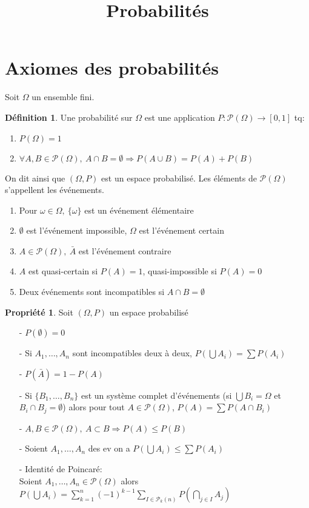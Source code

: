 \documentclass[fleqn]{article}
\title{Probabilit\'es}
\date{}
\theoremstyle{definition} \newtheorem*{defi}{D\'efinition}
\theoremstyle{definition} \newtheorem*{theo}{Th\'eor\`eme}
\theoremstyle{definition} \newtheorem*{coro}{Corollaire}
\theoremstyle{remark} \newtheorem*{rqs}{Remarques}
\theoremstyle{definition} \newtheorem*{prop}{Propri\'et\'e}
\begin{document}
\maketitle

\section{Axiomes des probabilit\'es}
Soit $\Omega$ un ensemble fini.
\begin{defi}
	Une probabilit\'e sur $\Omega$ est une application $P: \mathcal{P}(\Omega) \rightarrow [0,1]$ tq:
	\begin{enumerate}
		\item $P(\Omega) = 1$
		\item $\forall A,B \in \mathcal{P}(\Omega),\ A \cap B = \emptyset \Rightarrow P(A \cup B) = P(A) + P(B)$
	\end{enumerate}
On dit ainsi que $(\Omega,P)$ est un espace probabilis\'e. Les \'el\'ements de $\mathcal{P}(\Omega)$ s'appellent les \'ev\'enements.
	\begin{enumerate}
		\item Pour $\omega \in \Omega,\ \{\omega\}$ est un \'ev\'enement \'el\'ementaire
		\item $\emptyset$ est l'\'ev\'enement impossible, $\Omega$ est l'\'ev\'enement certain
		\item $A \in \mathcal{P}(\Omega),\ \bar{A}$ est l'\'ev\'enement contraire
		\item $A$ est quasi-certain si $P(A) = 1$, quasi-impossible si $P(A) = 0$
		\item Deux \'ev\'enements sont incompatibles si $A \cap B = \emptyset$
	\end{enumerate}
\end{defi}

\begin{prop} Soit $(\Omega, P)$ un espace probabilis\'e
	\begin{itemize}
		\item [-] $P(\emptyset) = 0$
		\item [-] Si $A_1, \hdots, A_n$ sont incompatibles deux \`a deux, $P(\bigcup A_i) = \sum P(A_i)$
		\item [-] $P(\bar{A}) = 1 - P(A)$
		\item [-] Si $\{B_1, \hdots, B_n\}$ est un syst\`eme complet d'\'ev\'enements (si $\bigcup B_i = \Omega$ et $B_i \cap B_j = \emptyset$)
			alors pour tout $A \in \mathcal{P}(\Omega)$, $P(A) = \sum P(A \cap B_i)$
		\item [-] $A,B \in \mathcal{P}(\Omega),\ A \subset B \Rightarrow P(A) \leq P(B)$
		\item [-] Soient $A_1, \hdots, A_n$ des ev on a $P(\bigcup A_i) \leq \sum P(A_i)$
		\item [-] Identit\'e de Poincar\'e:\\
			Soient $A_1, \hdots, A_n \in \mathcal{P}(\Omega)$ alors $P(\bigcup A_i) = \sum_{k=1}^n (-1)^{k-1} \sum_{I \in \mathcal{P}_k(n)}
			P(\bigcap_{j \in I} A_j)$
	\end{itemize}
\end{prop}
\end{document}
